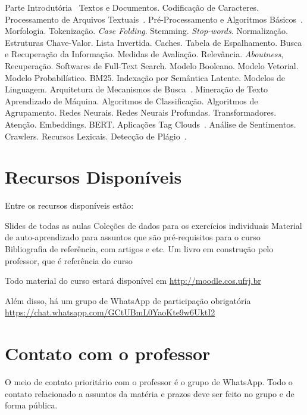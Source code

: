 \documentclass{article}
\begin{document}
\begin{outline}
\1 Parte Introdutória~\citep{xexeo2023}
\2 Textos e Documentos. Codificação de Caracteres. Processamento de Arquivos Textuais~\citep{xexeo2023}. 
\1 Pré-Processamento e Algoritmos Básicos~\citep{xexeo2023,jurafsky2022}.
\2 Morfologia. Tokenização. \textit{Case Folding}. Stemming. \textit{Stop-words}. Normalização. Estruturas Chave-Valor. Lista Invertida. Caches. Tabela de Espalhamento. 
\1 Busca e Recuperação da Informação.
\2 Medidas de Avaliação. Relevância. \textit{Aboutness}, Recuperação. Softwares de Full-Text Search. Modelo Booleano. Modelo Vetorial. Modelo Probabilístico. BM25. Indexação por Semântica Latente. Modelos de Linguagem. Arquitetura de Mecanismos de Busca~\citep{Baeza2011}.
\1 Mineração de Texto~\citep{jurafsky2022}
\2 Aprendizado de Máquina.
  Algoritmos de
Classificação. Algoritmos de Agrupamento. Redes Neurais. Redes Neurais Profundas. Transformadores. Atenção. Embeddings. BERT.  
\1 Aplicações
\2 Tag Clouds~\citep{Morgado2010,xexeo2022,xexeo2023}. Análise de Sentimentos. Crawlers. Recursos Lexicais. Detecção de Plágio~\citep{Abreu2011,Duarte2017}. 
\end{outline}
\section{Recursos Disponíveis}

    Entre os recursos disponíveis estão:
    \begin{outline}
        
    
        \1 Slides de todas as aulas
        \1 Coleções de dados para os exercícios individuais
        \1 Material de auto-aprendizado para assuntos que são pré-requisitos para o curso
        \1 Bibliografia de referência, com artigos e etc.
        \1 Um livro em construção pelo professor, que é referência do curso
    \end{outline}

 Todo material do curso estará disponível em \url{http://moodle.cos.ufrj.br}
 
 Além disso, há um grupo de WhatsApp de participação obrigatória \url{https://chat.whatsapp.com/GCtUBmL0YaoKte9w6UktI2}


\section{Contato com o professor}

O meio de contato prioritário com o professor é o grupo de WhatsApp. Todo o contato relacionado a assuntos da matéria e prazos deve ser feito no grupo e de forma pública.
\end{document}
